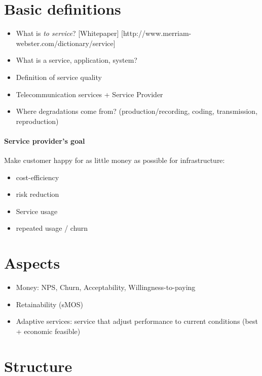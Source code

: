 \section{Basic definitions}
\begin{itemize}
\item What is \emph{to service}? [Whitepaper] [http://www.merriam-webster.com/dictionary/service]
\item What is a service, application, system?
\item Definition of service quality
\item Telecommunication services + Service Provider
\item Where degradations come from? (production/recording, coding, transmission, reproduction)
\end{itemize}

\paragraph*{Service provider's goal}
Make customer happy for as little money as possible for infrastructure: 
\begin{itemize}
\item cost-efficiency
\item risk reduction
\item Service usage
\item repeated usage / churn
\end{itemize}

\section{Aspects}
\begin{itemize}
\item Money: NPS, Churn, Acceptability, Willingness-to-paying
\item Retainability (sMOS)
\item Adaptive services: service that adjust performance to current conditions (best + economic feasible)
\end{itemize}

\section{Structure}
